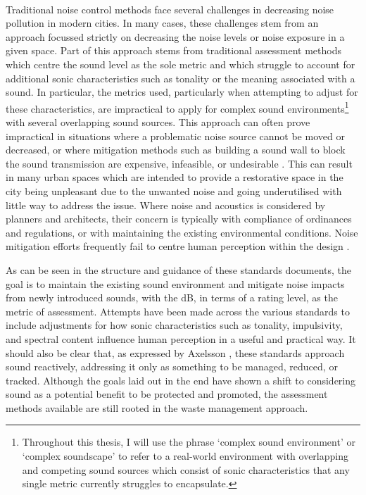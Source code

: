\paragraph*{} Traditional noise control methods face several challenges in decreasing noise pollution in modern cities. In many cases, these challenges stem from an approach focussed strictly on decreasing the noise levels or noise exposure in a given space. Part of this approach stems from traditional assessment methods which centre the sound level as the sole metric and which struggle to account for additional sonic characteristics such as tonality or the meaning associated with a sound. In particular, the metrics used, particularly when attempting to adjust for these characteristics, are impractical to apply for complex sound environments\footnote{Throughout this thesis, I will use the phrase `complex sound environment' or `complex soundscape' to refer to a real-world environment with overlapping and competing sound sources which consist of sonic characteristics that any single metric currently struggles to encapsulate.} with several overlapping sound sources. This approach can often prove impractical in situations where a problematic noise source cannot be moved or decreased, or where mitigation methods such as building a sound wall to block the sound transmission are expensive, infeasible, or undesirable \citep{Ekici2003Review}. This can result in many urban spaces which are intended to provide a restorative space in the city being unpleasant due to the unwanted noise and going underutilised with little way to address the issue. Where noise and acoustics is considered by planners and architects, their concern is typically with compliance of ordinances and regulations, or with maintaining the existing environmental conditions. Noise mitigation efforts frequently fail to centre human perception within the design \citep{Coelho2016Soundscape}. 

As can be seen in the structure and guidance of these standards documents, the goal is to maintain the existing sound environment and mitigate noise impacts from newly introduced sounds, with the dB, in terms of a rating level, as the metric of assessment. Attempts have been made across the various standards to include adjustments for how sonic characteristics such as tonality, impulsivity, and spectral content influence human perception in a useful and practical way. It should also be clear that, as expressed by Axelsson \citep{Axelsson2020Soundscape}, these standards approach sound reactively, addressing it only as something to be managed, reduced, or tracked. Although the goals laid out in the \gls{end} have shown a shift to considering sound as a potential benefit to be protected and promoted, the assessment methods available are still rooted in the waste management approach. 

